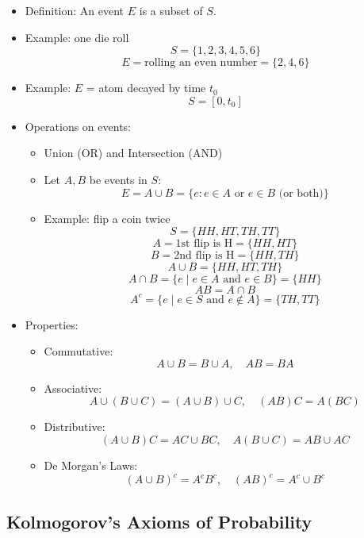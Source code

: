 \begin{itemize}
      \item Definition: An event $E$ is a subset of $S$.
      \item Example: one die roll
            \[ S = \{1, 2, 3, 4, 5, 6\} \]
            \[ E = \text{rolling an even number} = \{2, 4, 6\} \]
      \item Example: $E$ = atom decayed by time $t_0$
            \[ S = [0, t_0] \]

      \item Operations on events:
            \begin{itemize}
                  \item Union (OR) and Intersection (AND)
                  \item Let $A, B$ be events in $S$:
                        \[ E = A \cup B = \{e: e \in A \text{ or } e \in B \text{ (or both)}\} \]
                  \item Example: flip a coin twice
                        \[ S = \{HH, HT, TH, TT\} \]
                        \[ A = \text{1st flip is H} = \{HH, HT\} \]
                        \[ B = \text{2nd flip is H} = \{HH, TH\} \]
                        \[ A \cup B = \{HH, HT, TH\} \]
                        \[ A \cap B = \{ e \mid e \in A \text{ and } e \in B \} = \{HH\} \]
                        \[ AB = A \cap B \]
                        \[ A^c = \{ e \mid e \in S \text{ and } e \notin A \} = \{TH, TT\} \]
            \end{itemize}

      \item Properties:
            \begin{itemize}
                  \item Commutative:
                        \[ A \cup B = B \cup A, \quad AB = BA \]
                  \item Associative:
                        \[ A \cup (B \cup C) = (A \cup B) \cup C , \quad (AB)C = A(BC) \]
                  \item Distributive:
                        \[ (A\cup B)C = AC \cup BC, \quad A(B \cup C) = AB \cup AC \]
                  \item De Morgan's Laws:
                        \[ (A \cup B)^c = A^c B^c, \quad (AB)^c = A^c \cup B^c \]
            \end{itemize}
\end{itemize}

\subsection{Kolmogorov's Axioms of Probability}

